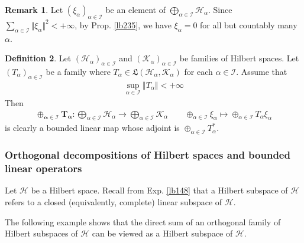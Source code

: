 \documentclass[12pt,b5paper,notitlepage]{article}
\theoremstyle{definition}
\newtheorem{df}{Definition}[subsection]
\newtheorem{rem}[df]{Remark}
\theoremstyle{plain}
\newcommand{\fk}{\mathfrak}
\newcommand{\MH}{\mathcal H}
\newcommand{\MK}{\mathcal K}
\newcommand{\SI}{\mathscr I}
\numberwithin{equation}{section}
\begin{document}
\begin{rem}\label{lb333}
Let $(\xi_\alpha)_{\alpha\in\SI}$ be an element of $\bigoplus_{\alpha\in\SI}\MH_\alpha$. Since $\sum_{\alpha\in\SI}\Vert\xi_\alpha\Vert^2<+\infty$, by Prop. \ref{lb235}, we have $\xi_\alpha=0$ for all but countably many $\alpha$.
\end{rem}



\begin{df}
Let $(\MH_\alpha)_{\alpha\in\SI}$ and $(\MK_\alpha)_{\alpha\in\SI}$ be families of Hilbert spaces. Let $(T_\alpha)_{\alpha\in\SI}$ be a family where $T_\alpha\in\fk L(\MH_\alpha,\MK_\alpha)$ for each $\alpha\in\SI$. Assume that
\begin{align*}
\sup_{\alpha\in\SI}\Vert T_\alpha\Vert<+\infty
\end{align*}
Then \index{T@$\oplus_{\alpha\in\SI}T_\alpha$}
\begin{gather*}
\pmb{\oplus_{\alpha\in\SI}T_\alpha}:\bigoplus_{\alpha\in\SI}\MH_\alpha\rightarrow\bigoplus_{\alpha\in\SI}\MK_\alpha\qquad \oplus_{\alpha\in\SI}\xi_\alpha\mapsto\oplus_{\alpha\in\SI}T_\alpha\xi_\alpha
\end{gather*}
is clearly a bounded linear map whose adjoint is $\oplus_{\alpha\in\SI}T_\alpha^*$. 
\end{df}


\subsubsection{Orthogonal decompositions of Hilbert spaces and bounded linear operators}

Let $\MH$ be a Hilbert space. Recall from Exp. \ref{lb148} that a Hilbert subspace of $\MH$ refers to a closed (equivalently, complete) linear subspace of $\MH$.

The following example shows that the direct sum of an orthogonal family of Hilbert subspaces of $\MH$ can be viewed as a Hilbert subspace of $\MH$.
\end{document}
